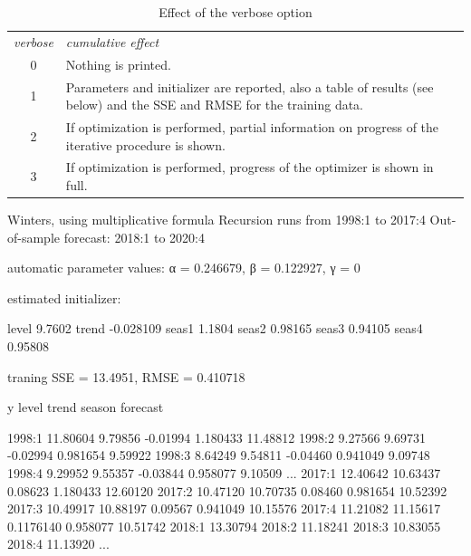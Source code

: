 \documentclass{article}
\begin{document}
\begin{table}[htbp]
  \caption{Effect of the verbose option}
  \label{tab:verbose}
  \begin{tabular}{cp{4.5in}}
    \textit{verbose} & \textit{cumulative effect} \\[6pt]
    0 & Nothing is printed. \\
    1 & Parameters and initializer are reported, also a table
        of results (see below) and the SSE and RMSE for the
        training data.\\
    2 & If optimization is performed, partial information on
        progress of the iterative procedure is shown. \\
    3 & If optimization is performed, progress of the
        optimizer is shown in full.
  \end{tabular}
\end{table}

\begin{script}[htbp]
  \caption{Partial listing of results from the first example on
    page~\ref{pg:ex1}: Forecasts for 2018:1 and beyond are
    out-of-sample.}
  \label{list:results}
\begin{code}
Winters, using multiplicative formula
Recursion runs from 1998:1 to 2017:4
Out-of-sample forecast: 2018:1 to 2020:4

automatic parameter values:
  α = 0.246679, β = 0.122927, γ = 0

estimated initializer:

level       9.7602
trend    -0.028109
seas1       1.1804
seas2      0.98165
seas3      0.94105
seas4      0.95808

traning SSE = 13.4951, RMSE = 0.410718

                  y        level        trend       season     forecast

1998:1     11.80604      9.79856     -0.01994     1.180433     11.48812
1998:2      9.27566      9.69731     -0.02994     0.981654      9.59922
1998:3      8.64249      9.54811     -0.04460     0.941049      9.09748
1998:4      9.29952      9.55357     -0.03844     0.958077      9.10509
...
2017:1     12.40642     10.63437      0.08623     1.180433     12.60120
2017:2     10.47120     10.70735      0.08460     0.981654     10.52392
2017:3     10.49917     10.88197      0.09567     0.941049     10.15576
2017:4     11.21082     11.15617    0.1176140     0.958077     10.51742
2018:1                                                         13.30794
2018:2                                                         11.18241
2018:3                                                         10.83055
2018:4                                                         11.13920
...
\end{code}
\end{script}
\end{document}
